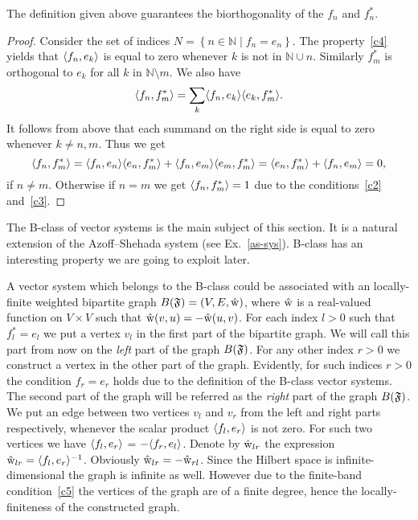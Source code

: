 \documentclass[12pt]{amsart}
\begin{document}
    \begin{prop}
      The definition given above guarantees the biorthogonality of the $f_n$ and $f^*_n$.
    \end{prop}
    \begin{proof}
      Consider the set of indices $N = \left\{n \in \mathbb{N} \mid f_n = e_n \right\}$.
      The property~\ref{c4} yields that $\langle f_n, e_k \rangle$ is equal to zero whenever $k$ is not in
        $\mathbb{N} \cup {n}$.
      Similarly $f^*_m$ is orthogonal to $e_k$ for all $k$ in $\mathbb{N} \setminus {m}$.
      We also have
      \[
        \langle f_n, f^*_m \rangle = \sum_{k} \langle f_n, e_k \rangle \langle e_k, f^*_m \rangle.
      \]
      It follows from above that each summand on the right side is equal to zero whenever $k \neq n, m$.
      Thus we get
      \[
        \langle f_n, f^*_m \rangle = \langle f_n, e_n \rangle \langle e_n, f^*_m \rangle + \langle f_n, e_m \rangle \langle e_m, f^*_m \rangle
        = \langle e_n, f^*_m \rangle + \langle f_n, e_m \rangle = 0,
      \]
      if $n \neq m$.
      Otherwise if $n = m$ we get $\langle f_n, f^*_m \rangle = 1$ due to the conditions~\ref{c2} and~\ref{c3}.
    \end{proof}
    The B-class of vector systems is the main subject of this section.
    It is a natural extension of the Azoff--Shehada system (see Ex.~\ref{as-sys}).
    B-class has an interesting property we are going to exploit later.
    \begin{remark}
      A vector system which belongs to the B-class could be associated with an
        locally-finite weighted bipartite graph $B(\mathfrak{F}) = (V, E, \mathrm{\hat{w}})$, where $\mathrm{\hat{w}}$ is a
        real-valued function on $V\times V$ such that $\mathrm{\hat{w}}(v, u) = -\mathrm{\hat{w}}(u, v)$.
      For each index $l > 0$ such that $f^*_l = e_l$ we put a vertex $v_l$ in the first part of the bipartite graph.
      We will call this part from now on the \emph{left} part of the graph $B(\mathfrak{F})$.
      For any other index $r > 0$ we construct a vertex in the other part of the graph.
      Evidently, for such indices $r > 0$ the condition $f_r = e_r$ holds due to the definition of the B-class vector systems.
      The second part of the graph will be referred as the \emph{right} part of the graph $B(\mathfrak{F})$.
      We put an edge between two vertices $v_l$ and $v_r$ from the left and right parts respectively,
        whenever the scalar product $\langle f_l, e_r \rangle$ is not zero.
      For such two vertices we have $\langle f_l, e_r \rangle$ = $-\langle f_r, e_l \rangle$.
      Denote by $\mathrm{\hat{w}}_{lr}$ the expression $\mathrm{\hat{w}}_{lr} = \langle f_l, e_r \rangle^{-1}$.
      Obviously $\mathrm{\hat{w}}_{lr} = -\mathrm{\hat{w}}_{rl}$.
      Since the Hilbert space is infinite-dimensional the graph is infinite as well.
      However due to the finite-band condition~\ref{c5} the vertices of the graph are of a finite degree, hence the locally-finiteness of
        the constructed graph.
    \end{remark}
\end{document}
